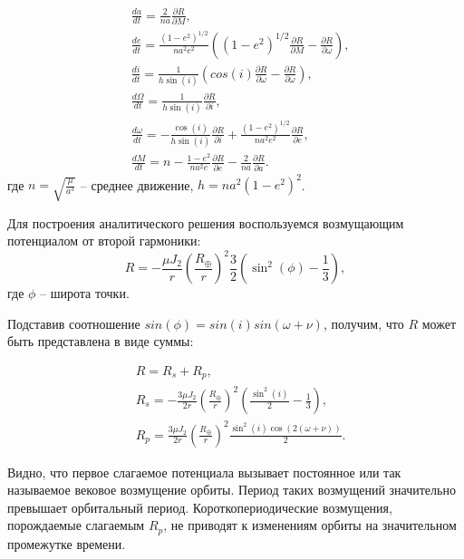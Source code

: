 \begin{align*}
    & \frac{da}{dt} = \frac{2}{na} \frac{\partial R}{\partial M}, \\
    & \frac{de}{dt} = \frac{(1 - e^2)^{1 / 2}}{n a^2 e^2}
                    \left((1 - e^2)^{1 / 2} \frac{\partial R}{\partial M} 
                    - \frac{\partial R}{\partial \omega} \right), \\
    & \frac{di}{dt} = \frac{1}{h \sin(i)} \left(cos(i) \frac{\partial R}{\partial \omega} 
                                                        - \frac{\partial R}{\partial \omega} \right), \\
    & \frac{d \Omega}{dt} = \frac{1}{h \sin(i)} \frac{\partial R}{\partial i}, \\
    & \frac{d \omega}{dt} = - \frac{\cos(i)}{h \sin(i)} \frac{\partial R}{\partial i}
                            + \frac{(1 - e^2)^{1 / 2}}{n a^2 e^2} \frac{\partial R}{\partial e}, \\
    & \frac{dM}{dt} = n - \frac{1 - e^2}{n a^2 e} \frac{\partial R}{\partial e} 
                        - \frac{2}{na} \frac{\partial R}{\partial a}.
\end{align*}
где $n = \sqrt{\frac{\mu}{a^3}}$ -- среднее движение, $h = n a^2 (1 - e^2)^2$.

Для построения аналитического решения воспользуемся возмущающим потенциалом от второй гармоники:
 \begin{equation}
    R = - \frac{\mu J_2}{r} \left( \frac{R_\oplus}{r} \right)^2 
        \frac{3}{2} \left(\sin^2(\phi) - \frac{1}{3}\right),
 \end{equation}
где $\phi$ -- широта точки.

Подставив соотношение $sin(\phi) = sin(i) sin(\omega + \nu)$, получим, что $R$ может быть представлена в виде суммы:

\begin{align*}
    & R = R_s + R_p, \\
    & R_s = - \frac{3 \mu J_2}{2 r} \left( \frac{R_\oplus}{r} \right)^2 
            \left( \frac{\sin^2(i)}{2} - \frac{1}{3} \right), \\
    & R_p = \frac{3 \mu J_2}{2 r} \left( \frac{R_\oplus}{r} \right)^2
            \frac{\sin^2(i) \cos(2(\omega + \nu))}{2}.
\end{align*}

Видно, что первое слагаемое потенциала вызывает постоянное или так называемое вековое возмущение орбиты. 
Период таких возмущений значительно превышает орбитальный период. 
Короткопериодические возмущения, порождаемые слагаемым $R_p$, не приводят к изменениям орбиты на значительном промежутке времени.

